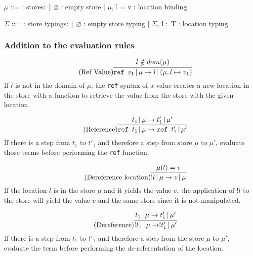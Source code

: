 \begin{bnfgrammar}
    $\mu$ ::= : stores$\colon$
    | $\varnothing$ : empty store
    | $\mu$, l = v : location binding
\end{bnfgrammar}\leavevmode\newline

\begin{bnfgrammar}
    $\Sigma$ ::= : store typings$\colon$
    | $\varnothing$ : empty store typing
    | $\Sigma$, l $\colon$ T : location typing
\end{bnfgrammar}\leavevmode\newline

\subsubsection{Addition to the evaluation rules \cite{pierce2002ProgLang}}
\begin{equation*}
    \tag{Ref Value}
    \infer{
        \texttt{ref } v_1\,|\,\mu \rightarrow l\,|\,(\mu, l \mapsto v_1)
    }{
        l \notin dom(\mu)
    }
\end{equation*}
If $l$ is not in the domain of $\mu$, the \texttt{ref} syntax of a
value creates a new location in the store with a function to
retrieve the value from the store with the given location.

\begin{equation*}
    \tag{Reference}
    \infer{
        \texttt{ref } t_1\,|\,\mu \rightarrow \texttt{ref } t'_1\,|\,\mu'
    }{
        t_1\,|\,\mu \rightarrow t'_1\,|\,\mu'
    }
\end{equation*}
If there is a step from $t_1$ to $t'_1$ and therefore a step
from store $\mu$ to $\mu'$, evaluate those terms before
performing the \texttt{ref} function.

\begin{equation*}
    \tag{Dereference location}
    \infer{
        !l\,|\,\mu \rightarrow v\,|\,\mu
    }{
        \mu(l) = v
    }
\end{equation*}
If the location $l$ is in the store $\mu$ and it yields the value $v$,
the application of $!l$ to the store will yield the value $v$ and the
same store since it is not manipulated.

\begin{equation*}
    \tag{Dereference}
    \infer{
        !t_1\,|\,\mu \rightarrow !t'_1\,|\,\mu'
    }{
        t_1\,|\,\mu \rightarrow t'_1\,|\,\mu'
    }
\end{equation*}
If there is a step from $t_1$ to $t'_1$ and therefore a step
from the store $\mu$ to $\mu'$, evaluate the term before
performing the de-referentation of the location.

